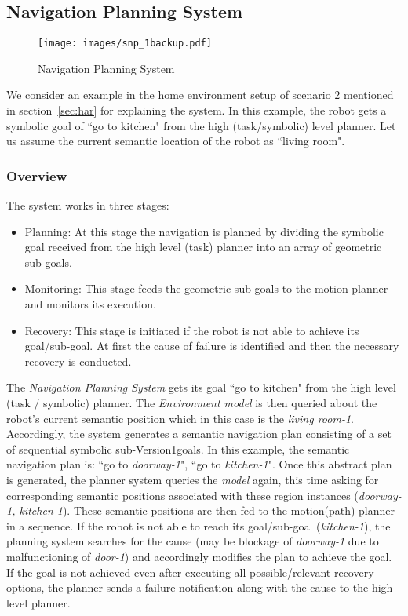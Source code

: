 \subsection{Navigation Planning System}
\begin{figure}[htbp] %
 \centering
   \texttt{[image: images/snp\_1backup.pdf]}
   \caption{Navigation Planning System}
   \label{Fig: Method of storing geometric shape of the room}
\end{figure}
We consider an example in the home environment setup of scenario 2 mentioned in section~\ref{sec:har}  for explaining the system. 
In this example, the robot gets a symbolic goal of ``go to kitchen" from the high 
(task/symbolic) level planner. Let us assume the current semantic location of the robot 
as ``living room".

\subsubsection{Overview}
The system works in three stages:
\begin{itemize}
 \item Planning: At this stage the navigation is planned by dividing the symbolic goal received from the high level (task) planner into an array of geometric sub-goals.
 \item Monitoring: This stage feeds the geometric sub-goals to the motion planner and monitors its execution.
 \item Recovery: This stage is initiated if the robot is not able to achieve its goal/sub-goal. At first the cause of failure is identified and then the necessary recovery is conducted.
\end{itemize}

The \textit{Navigation Planning System} gets its goal ``go to kitchen" from the high level 
(task / symbolic) planner.
The \textit{Environment model} is then queried about the robot's current semantic position which in this case is the \textit{living room-1}.
Accordingly, the system generates a semantic navigation plan consisting of a set of sequential symbolic sub-Version1goals.
In this example, the semantic navigation plan is: ``go to \textit{doorway-1}", ``go to \textit{kitchen-1}".
Once this abstract plan is generated, the planner system queries the \textit{model} again, this time asking for corresponding semantic positions associated with these region instances (\textit{doorway-1, kitchen-1}).
These semantic positions are then fed to the motion(path) planner in a sequence.
If the robot is not able to reach its goal/sub-goal (\textit{kitchen-1}), the planning system searches for the cause (may be blockage of \textit{doorway-1} due to malfunctioning of \textit{door-1})
and accordingly modifies the plan to achieve the goal.
If the goal is not achieved even after executing all possible/relevant recovery options, the planner sends a failure notification along with the cause
to the high level planner.\\

